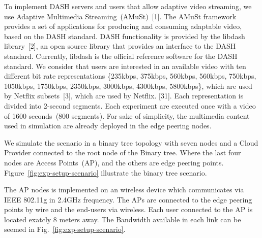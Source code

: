 
To implement DASH servers and users that allow adaptive video streaming, we use Adaptive Multimedia Streaming~(AMuSt)~[1]. The AMuSt framework provides a set of applications for producing and consuming adaptable video, based on the DASH standard. DASH functionality is provided by the libdash library~[2], an open source library that provides an interface to the DASH standard. Currently, libdash is the official reference software for the DASH standard. We consider that users are interested in an available video with ten different bit rate representations \{235kbps, 375kbps, 560kbps, 560kbps, 750kbps, 1050kbps, 1750kbps, 2350kbps, 3000kbps, 4300kbps, 5800kbps\}, which are used by Netflix subsets~[3], which are used by Netflix. [31]. Each representation is divided into 2-second segments. Each experiment are executed once with a video of 1600 seconds~(800 segments). 
For sake of simplicity, the multimedia content used in simulation are already deployed in the edge peering nodes. 


We simulate the scenario in a binary tree topology with seven nodes and a Cloud Provider connected to the root node of the Binary tree. Where the last four nodes are Access Points~(AP), and the others are edge peering points. Figure~\ref{fig:exp-setup-scenario} illustrate the binary tree scenario.

The AP nodes is implemented on an wireless device which communicates via IEEE 802.11g in 2.4GHz frequency. The APs are connected to the edge peering points by wire and the end-users via wireless. Each user connected to the AP is located exatcly 8 meters away. The Bandwidth available in each link can be seemed in Fig.~\ref{fig:exp-setup-scenario}.

